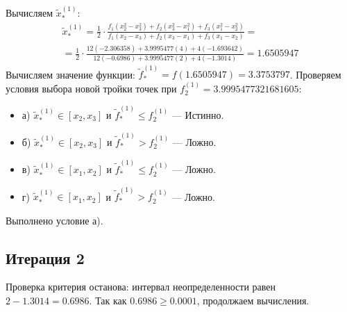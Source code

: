 \documentclass[12pt]{article}
\begin{document}
Вычисляем \( \tilde{x}_{*}^{(1)} \):
\begin{multline*}
\tilde{x}_{*}^{(1)} = \frac{1}{2}\cdot\frac{f_1(x_2^2 - x_3^2) + f_2(x_3^2 - x_1^2) + f_3(x_1^2 - x_2^2)}{f_1(x_2 - x_3) + f_2(x_3 - x_1) + f_3(x_1 - x_2)} = \\
= \frac{1}{2}\cdot\frac{12(-2.306358) + 3.9995477(4) + 4(-1.693642)}{12(-0.6986) + 3.9995477(2) + 4(-1.3014)} = 1.6505947
\end{multline*}
Вычисляем значение функции: \( \tilde{f}_{*}^{(1)} = f(1.6505947) = 3.3753797\).
Проверяем условия выбора новой тройки точек при $f_2^{(1)} = 3.9995477321681605$:
\begin{itemize}
  \item а) \( \tilde{x}_{*}^{(1)} \in [x_2, x_3] \) и \( \tilde{f}_{*}^{(1)} \le f_2^{(1)} \) --- Истинно.
  \item б) \( \tilde{x}_{*}^{(1)} \in [x_2, x_3] \) и \( \tilde{f}_{*}^{(1)} > f_2^{(1)} \) --- Ложно.
  \item в) \( \tilde{x}_{*}^{(1)} \in [x_1, x_2] \) и \( \tilde{f}_{*}^{(1)} \le f_2^{(1)} \) --- Ложно.
  \item г) \( \tilde{x}_{*}^{(1)} \in [x_1, x_2] \) и \( \tilde{f}_{*}^{(1)} > f_2^{(1)} \) --- Ложно.
\end{itemize}
Выполнено условие а).
\begin{center}
\end{center}
\subsection{Итерация 2}
Проверка критерия останова: интервал неопределенности равен \( 2 - 1.3014 = 0.6986 \).
Так как \( 0.6986 \ge 0.0001 \), продолжаем вычисления.
\end{document}
